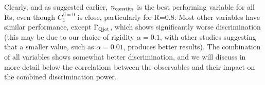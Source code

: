 %
Clearly, and as suggested earlier, $n_{\rm constits}$ is the best performing variable for all Rs, even though $C_1^{\beta=0}$ is close, particularly
for R=0.8. Most other variables have similar performance, except $\Gamma_{\rm Qjet}$, which shows significantly worse
discrimination (this may be due to our choice of
rigidity $\alpha = 0.1$, with other studies suggesting that a smaller value,
such as $\alpha = 0.01$, produces better results\cite{Ellis:2012sn,Ellis:2014eya}). The combination of all variables shows somewhat better discrimination, and
we will discuss in more detail below the correlations between the observables and their impact on the combined discrimination power.

%
\begin{figure}
\centering
{}
\\
\\

\end{figure}
